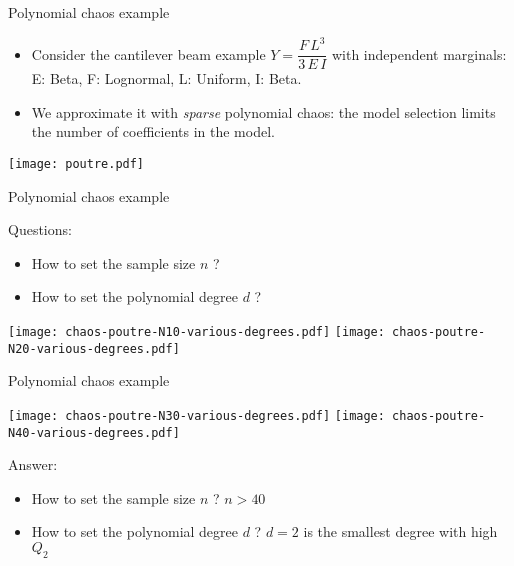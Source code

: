 \documentclass{beamer}
\begin{document}

\begin{frame}[t]{Polynomial chaos example}

\begin{example}
\begin{itemize}
\item Consider the cantilever beam example $Y  = \dfrac{F\, L^3}{3 \, E \, I}$
with independent marginals: E: Beta, F: Lognormal, L: Uniform, 
I: Beta.

\item We approximate it with \emph{sparse} polynomial chaos: the model 
selection limits the number of coefficients in the model.
\end{itemize}

\end{example}

\begin{center}
 \texttt{[image: poutre.pdf]}
\end{center}

\end{frame}


\begin{frame}[t]{Polynomial chaos example}

Questions:
\begin{itemize}
\item How to set the sample size $n$ ?
\item How to set the polynomial degree $d$ ?
\end{itemize}

\begin{center}
\texttt{[image: chaos-poutre-N10-various-degrees.pdf]}
\texttt{[image: chaos-poutre-N20-various-degrees.pdf]}
\end{center}

\end{frame}


\begin{frame}[t]{Polynomial chaos example}

\begin{center}
\texttt{[image: chaos-poutre-N30-various-degrees.pdf]}
\texttt{[image: chaos-poutre-N40-various-degrees.pdf]}
\end{center}

Answer:
\begin{itemize}
\item How to set the sample size $n$ ? $n>40$
\item How to set the polynomial degree $d$ ? $d=2$ is the smallest 
degree with high $Q_2$
\end{itemize}


\end{frame}
\end{document}
